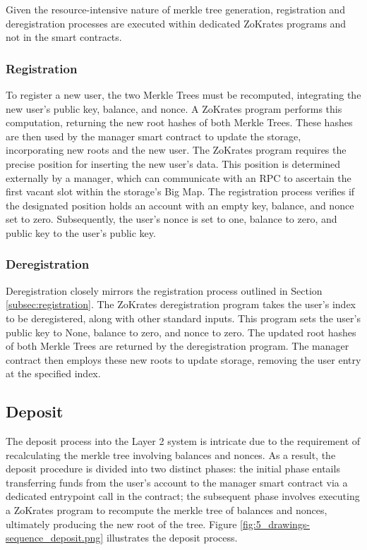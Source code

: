 Given the resource-intensive nature of merkle tree generation, registration and deregistration processes are executed within dedicated ZoKrates programs and not in the smart contracts.

\subsubsection{Registration\label{subsec:registration}}

To register a new user, the two Merkle Trees must be recomputed, integrating the new user's public key, balance, and nonce. A ZoKrates program performs this computation, returning the new root hashes of both Merkle Trees. These hashes are then used by the manager smart contract to update the storage, incorporating new roots and the new user. The ZoKrates program requires the precise position for inserting the new user's data. This position is determined externally by a manager, which can communicate with an RPC to ascertain the first vacant slot within the storage's Big Map. The registration process verifies if the designated position holds an account with an empty key, balance, and nonce set to zero. Subsequently, the user's nonce is set to one, balance to zero, and public key to the user's public key.

\subsubsection{Deregistration}

Deregistration closely mirrors the registration process outlined in Section \ref{subsec:registration}. The ZoKrates deregistration program takes the user's index to be deregistered, along with other standard inputs. This program sets the user's public key to None, balance to zero, and nonce to zero. The updated root hashes of both Merkle Trees are returned by the deregistration program. The manager contract then employs these new roots to update storage, removing the user entry at the specified index.

\subsection{Deposit\label{subsec:deposit}}
The deposit process into the Layer 2 system is intricate due to the requirement of recalculating the merkle tree involving balances and nonces. As a result, the deposit procedure is divided into two distinct phases: the initial phase entails transferring funds from the user's account to the manager smart contract via a dedicated entrypoint call in the contract; the subsequent phase involves executing a ZoKrates program to recompute the merkle tree of balances and nonces, ultimately producing the new root of the tree. Figure \ref{fig:5_drawings-sequence_deposit.png} illustrates the deposit process.

